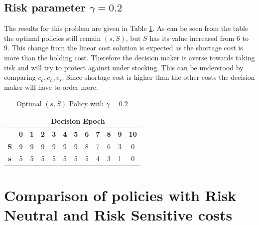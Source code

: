 \documentclass[11pt,a4paper,oneside]{report}
\begin{document}
\subsection{Risk parameter $\gamma= 0.2$}
The results for this problem are given in Table \ref{t8}. As can be seen from the table the optimal policies still remain $(s,S)$, but $S$ has its value increased from 6 to 9. This change from the linear cost solution is expected as the shortage cost is more than the holding cost. Therefore the decision maker is averse towards taking risk and will try to protect against under stocking. This can be understood by comparing $c_o, c_h, c_s$. Since shortage cost is higher than the other costs the decision maker will have to order more. 
\begin{table}[h]
\centering
\caption{Optimal $(s,S)$ Policy with $\gamma=0.2$}
\label{t8}
\begin{tabular}{|c|c|c|c|c|c|c|c|c|c|c|c|}
\hline
           & \multicolumn{11}{c|}{\textbf{Decision Epoch}}                                                                                                 \\ \hline
           & \textbf{0} & \textbf{1} & \textbf{2} & \textbf{3} & \textbf{4} & \textbf{5} & \textbf{6} & \textbf{7} & \textbf{8} & \textbf{9} & \textbf{10} \\ \hline
\textbf{S} & 9          & 9          & 9          & 9          & 9          & 9          & 8          & 7          & 6          & 3          & 0           \\ \hline
\textbf{s} & 5          & 5          & 5          & 5          & 5          & 5          & 5          & 4          & 3          & 1          & 0           \\ \hline
\end{tabular}
\end{table}

\section{Comparison of policies with Risk Neutral and Risk Sensitive costs}
\end{document}

